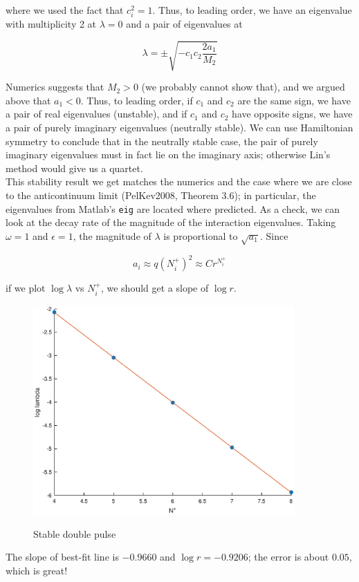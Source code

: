 \documentclass[12pt]{article}
\begin{document}
where we used the fact that $c_i^2 = 1$. Thus, to leading order, we have an eigenvalue with multiplicity 2 at $\lambda = 0$ and a pair of eigenvalues at

\[
\lambda = \pm \sqrt{ -c_1 c_2 \dfrac{2 a_1 }{ M_2 } }
\]

Numerics suggests that $M_2 > 0$ (we probably cannot show that), and we argued above that $a_1 < 0$. Thus, to leading order, if $c_1$ and $c_2$ are the same sign, we have a pair of real eigenvalues (unstable), and if $c_1$ and $c_2$ have opposite signs, we have a pair of purely imaginary eigenvalues (neutrally stable). We can use Hamiltonian symmetry to conclude that in the neutrally stable case, the pair of purely imaginary eigenvalues must in fact lie on the imaginary axis; otherwise Lin's method would give us a quartet.\\

This stability result we get matches the numerics and the case where we are close to the anticontinuum limit (PelKev2008, Theorem 3.6); in particular, the eigenvalues from Matlab's \texttt{eig} are located where predicted. As a check, we can look at the decay rate of the magnitude of the interaction eigenvalues. Taking $\omega = 1$ and $\epsilon = 1$, the magnitude of $\lambda$ is proportional to $\sqrt{a_1}$. Since

\[
a_i \approx q(N_i^+)^2 \approx C r^{N_i^+}
\] 

if we plot $\log \lambda$ vs $N_i^+$, we should get a slope of $\log r$.

\begin{figure}[H]
\centering
\includegraphics[width=10cm]{dnlslog.eps}
\label{fig:spec1}
\caption{Stable double pulse}
\end{figure}

The slope of best-fit line is $-0.9660$ and $\log r = -0.9206$; the error is about $0.05$, which is great!
\end{document}
